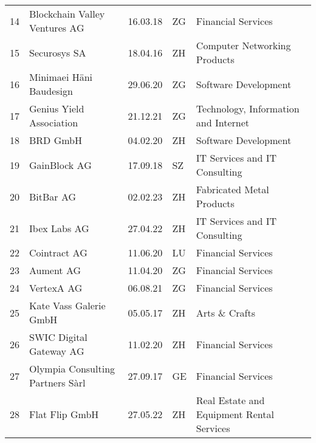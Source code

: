 \begin{tabular}{lllll}
14  &                      Blockchain Valley Ventures AG &      16.03.18 &     ZG &                             Financial Services \\
15  &                                       Securosys SA &      18.04.16 &     ZH &                   Computer Networking Products \\
16  &                            Minimaei Häni Baudesign &      29.06.20 &     ZG &                           Software Development \\
17  &                           Genius Yield Association &      21.12.21 &     ZG &           Technology, Information and Internet \\
18  &                                           BRD GmbH &      04.02.20 &     ZH &                           Software Development \\
19  &                                       GainBlock AG &      17.09.18 &     SZ &                  IT Services and IT Consulting \\
20  &                                          BitBar AG &      02.02.23 &     ZH &                      Fabricated Metal Products \\
21  &                                       Ibex Labs AG &      27.04.22 &     ZH &                  IT Services and IT Consulting \\
22  &                                       Cointract AG &      11.06.20 &     LU &                             Financial Services \\
23  &                                          Aument AG &      11.04.20 &     ZG &                             Financial Services \\
24  &                                         VertexA AG &      06.08.21 &     ZG &                             Financial Services \\
25  &                             Kate Vass Galerie GmbH &      05.05.17 &     ZH &                                  Arts \& Crafts \\
26  &                            SWIC Digital Gateway AG &      11.02.20 &     ZH &                             Financial Services \\
27  &                   Olympia Consulting Partners Sàrl &      27.09.17 &     GE &                             Financial Services \\
28  &                                     Flat Flip GmbH &      27.05.22 &     ZH &      Real Estate and Equipment Rental Services \\

\end{tabular}
